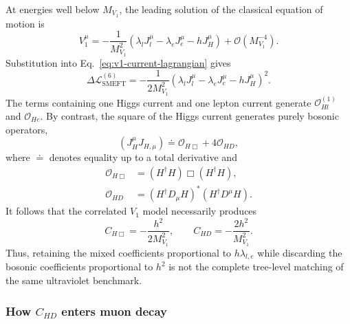 At energies well below $M_{V_1}$, the leading solution of the classical
equation of motion is
\begin{equation}
    V_1^\mu
    =-\frac{1}{M_{V_1}^2}
       \left(
          \lambda_l J_l^\mu
          -\lambda_e J_e^\mu
          -hJ_H^\mu
       \right)
       +\mathcal O(M_{V_1}^{-4}).
\end{equation}
Substitution into Eq.~\eqref{eq:v1-current-lagrangian} gives
\begin{equation}
    \Delta\mathcal L_{\mathrm{SMEFT}}^{(6)}
    =-\frac{1}{2M_{V_1}^2}
       \left(
          \lambda_l J_l^\mu
          -\lambda_e J_e^\mu
          -hJ_H^\mu
       \right)^2.
    \label{eq:v1-current-square}
\end{equation}
The terms containing one Higgs current and one lepton current generate
$\mathcal O_{Hl}^{(1)}$ and $\mathcal O_{He}$.  By contrast, the square
of the Higgs current generates purely bosonic operators,
\begin{equation}
    \left(J_H^\mu J_{H,\mu}\right)
    \doteq
    \mathcal O_{H\Box}+4\mathcal O_{HD},
    \label{eq:higgs-current-warsaw-decomposition}
\end{equation}
where $\doteq$ denotes equality up to a total derivative and
\begin{align}
    \mathcal O_{H\Box}
    &=(H^\dagger H)\Box(H^\dagger H),
    \\
    \mathcal O_{HD}
    &=\left(H^\dagger D_\mu H\right)^*
      \left(H^\dagger D^\mu H\right).
\end{align}
It follows that the correlated $V_1$ model necessarily produces
\begin{equation}
    C_{H\Box}=-\frac{h^2}{2M_{V_1}^2},
    \qquad
    C_{HD}=-\frac{2h^2}{M_{V_1}^2}.
    \label{eq:v1-bosonic-matching}
\end{equation}
Thus, retaining the mixed coefficients proportional to
$h\lambda_{l,e}$ while discarding the bosonic coefficients proportional
to $h^2$ is not the complete tree-level matching of the same ultraviolet
benchmark.

\subsubsection{How $C_{HD}$ enters muon decay}

